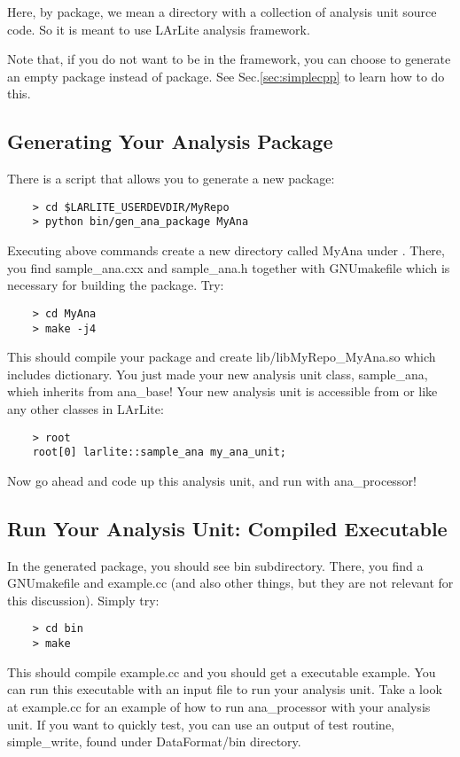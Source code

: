 
Here, by \Analysis package, we mean a directory with a collection of analysis unit source code. So it is meant to use LArLite analysis framework. 

Note that, if you do not want to be in the \Analysis framework, you can choose to generate an empty \CPP package instead of \Analysis package. See Sec.\ref{sec:simplecpp} to learn how to do this.

\subsection{Generating Your Analysis Package}
There is a \python script that allows you to generate a new package:
\begin{lstlisting}
    > cd $LARLITE_USERDEVDIR/MyRepo
    > python bin/gen_ana_package MyAna
\end{lstlisting}
Executing above commands create a new directory called MyAna under \UserDev. There, you find {\ttfamily sample\_ana.cxx} and {\ttfamily sample\_ana.h} together with {\ttfamily GNUmakefile} which is necessary for building the package. Try:
\begin{lstlisting}
    > cd MyAna
    > make -j4
\end{lstlisting}
This should compile your package and create {\ttfamily lib/libMyRepo\_MyAna.so} which includes \CINT dictionary. You just made your new analysis unit class, {\ttfamily sample\_ana}, whieh inherits from {\ttfamily ana\_base}! Your new analysis unit is accessible from \CINT or \PyROOT like any other classes in LArLite:
\begin{lstlisting}
    > root
    root[0] larlite::sample_ana my_ana_unit;
\end{lstlisting}
Now go ahead and code up this analysis unit, and run with {\ttfamily ana\_processor}!

\subsection{Run Your Analysis Unit: Compiled Executable}
\label{sec:yourcompiledexe}
In the generated package, you should see {\ttfamily bin} subdirectory. There, you find a {\ttfamily GNUmakefile}
and {\ttfamily example.cc} (and also other things, but they are not relevant for this discussion).
Simply try:
\begin{lstlisting}
    > cd bin
    > make
\end{lstlisting}
This should compile {\ttfamily example.cc} and you should get a \CPP executable {\ttfamily example}.
You can run this executable with an input file to run your analysis unit. Take a look at example.cc
for an example of how to run {\ttfamily ana\_processor} with your analysis unit. If you want to quickly
test, you can use an output of \DataFormat test routine, {\ttfamily simple\_write}, found under DataFormat/bin 
directory.

